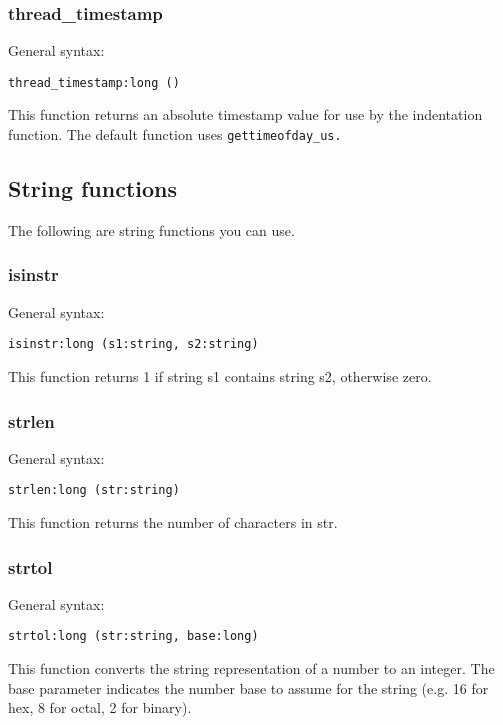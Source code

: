 \documentclass[twoside,english]{article}
\newenvironment{vindent}
{\begin{list}{}{\setlength{\listparindent}{6pt}}
\item[]}
{\end{list}}
\begin{document}
\subsubsection{thread\_timestamp}

General syntax:

\begin{vindent}
\begin{verbatim}
thread_timestamp:long ()
\end{verbatim}
\end{vindent}
This function returns an absolute timestamp value for use by the indentation
function. The default function uses \texttt{gettimeofday\_us.}


\subsection{String functions}
The following are string functions you can use.


\subsubsection{isinstr}
General syntax:

\begin{vindent}
\begin{verbatim}
isinstr:long (s1:string, s2:string)
\end{verbatim}
\end{vindent}
This function returns 1 if string s1 contains string s2, otherwise zero.


\subsubsection{strlen}
General syntax:

\begin{vindent}
\begin{verbatim}
strlen:long (str:string)
\end{verbatim}
\end{vindent}
This function returns the number of characters in str.


\subsubsection{strtol}

General syntax:

\begin{vindent}
\begin{verbatim}
strtol:long (str:string, base:long)
\end{verbatim}
\end{vindent}
This function converts the string representation of a number to an integer.
The base parameter indicates the number base to assume for the string (e.g.
16 for hex, 8 for octal, 2 for binary).
\end{document}
